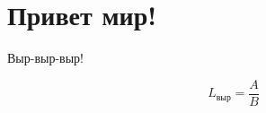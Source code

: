 \documentclass[unicode, 12pt, a4paper, oneside, fleqn]{article}
\begin{document}
\section{Привет мир!}

Выр-выр-выр!

$$ L_\text{выр} = \dfrac{A}{B} $$
\end{document}
